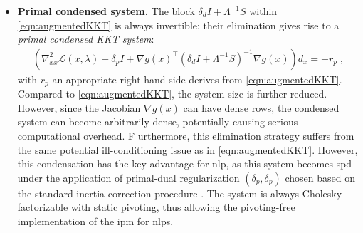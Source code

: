 \documentclass{article}
\begin{document}
\begin{itemize}[leftmargin=*,itemsep=0pt,parsep=0pt,partopsep=0pt]
\item \textbf{Primal condensed system.}
The block $\delta_d I + \Lambda^{-1}S$ within \eqref{eqn:augmentedKKT} is always invertible; their elimination gives rise to a \emph{primal condensed KKT system}:
\begin{align}\label{eqn:kkt_primal}
  \left(\nabla^2_{x x} \mathcal{L}(x, \lambda) + \delta_p I + \nabla g(x)^\top (\delta_d I + \Lambda^{-1} S)^{-1} \nabla g(x)  \right) d_x = - r_p \; ,
\end{align}
with $r_p$ an appropriate right-hand-side derives from \eqref{eqn:augmentedKKT}.
Compared to \cref{eqn:augmentedKKT}, the system size is further reduced.
However, since the Jacobian $\nabla g(x)$ can have dense rows, the condensed system can become arbitrarily dense, potentially causing serious computational overhead. F
urthermore, this elimination strategy suffers from the same potential ill-conditioning issue as in \cref{eqn:augmentedKKT}.
However, this condensation has the key advantage for \gls*{nlp}, as this system becomes \gls*{spd} under the application of primal-dual regularization $(\delta_p, \delta_p)$ chosen based on the standard inertia correction procedure \cite{shinAcceleratingOptimalPower2024}.
The system is always Cholesky factorizable with static pivoting, thus allowing the pivoting-free implementation of the \gls*{ipm} for \glspl*{nlp}.


\end{itemize}
\end{document}

